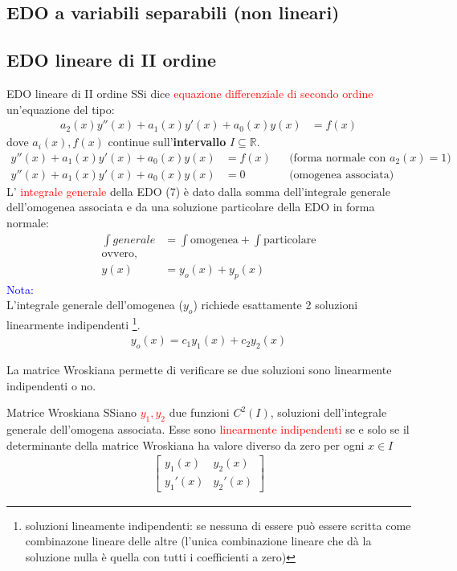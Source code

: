 \documentclass{article}  %
\begin{document}
\subsection{EDO a variabili separabili (non lineari)}
\subsection{EDO lineare di II ordine}
\begin{definition}{EDO lineare di II ordine}
	SSi dice \textcolor{red}{equazione differenziale di secondo ordine} un'equazione del tipo:
	\begin{align*}
		a_2(x)y''(x)+a_1(x)y'(x)+a_0(x)y(x) & = f(x)
	\end{align*}
	dove $a_i(x), f(x)$ continue sull'\textbf{intervallo} $I \subseteq \mathbb{R}$.
	\begin{align}
		y''(x)+a_1(x)y'(x)+a_0(x)y(x) & = f(x) &  & \text{(forma normale con $a_2(x)=1$)} \\
		y''(x)+a_1(x)y'(x)+a_0(x)y(x) & = 0    &  & \text{(omogenea associata)}
	\end{align}
	L' \textcolor{red}{integrale generale} della EDO (7) è dato dalla somma dell'integrale generale dell'omogenea associata e da una soluzione particolare della EDO in forma normale:
	\begin{align*}
		\int generale & = \int \text{omogenea} + \int \text{particolare} \\
		\text{ovvero,}                                                   \\
		y(x)          & = y_o(x) + y_p(x)
	\end{align*}
	\textcolor{blue}{Nota:} \\
	L'integrale generale dell'omogenea ($y_o$) richiede esattamente 2 soluzioni linearmente indipendenti
	\footnote{soluzioni lineamente indipendenti: se nessuna di essere può essere scritta come combinazone lineare
		delle altre (l'unica combinazione lineare che dà la soluzione nulla è quella con tutti i coefficienti a zero)}.
	\begin{align*}
		y_o(x)=c_1 y_1(x)+c_2 y_2(x)
	\end{align*}
\end{definition}
La matrice Wroskiana permette di verificare se due soluzioni sono linearmente indipendenti o no.
\begin{definition}{Matrice Wroskiana}
	SSiano \textcolor{red}{$y_1,y_2$} due funzioni $C^2(I)$, soluzioni dell'integrale generale dell'omogena associata. Esse sono \textcolor{red}{linearmente indipendenti} se e solo se il determinante
	della matrice Wroskiana ha valore diverso da zero per ogni $x \in I$
	\begin{align*}
		\begin{bmatrix}
			y_1(x)  & y_2(x)  \\
			y_1'(x) & y_2'(x)
		\end{bmatrix}
	\end{align*}

\end{definition}
\end{document}
